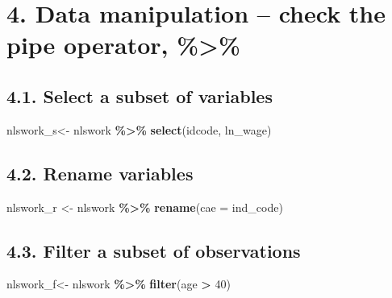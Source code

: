 \documentclass[
]{article}
\newenvironment{Shaded}{\begin{snugshade}}{\end{snugshade}}
\newcommand{\AttributeTok}[1]{\textcolor[rgb]{0.13,0.29,0.53}{#1}}
\newcommand{\DecValTok}[1]{\textcolor[rgb]{0.00,0.00,0.81}{#1}}
\newcommand{\FunctionTok}[1]{\textcolor[rgb]{0.13,0.29,0.53}{\textbf{#1}}}
\newcommand{\NormalTok}[1]{#1}
\newcommand{\OtherTok}[1]{\textcolor[rgb]{0.56,0.35,0.01}{#1}}
\newcommand{\SpecialCharTok}[1]{\textcolor[rgb]{0.81,0.36,0.00}{\textbf{#1}}}
\begin{document}
\hypertarget{data-manipulation-check-the-pipe-operator}{%
\section{4. Data manipulation -- check the pipe operator,
\%\textgreater\%}\label{data-manipulation-check-the-pipe-operator}}

\hypertarget{select-a-subset-of-variables}{%
\subsection{4.1. Select a subset of
variables}\label{select-a-subset-of-variables}}

\begin{Shaded}
\begin{Highlighting}[]
\NormalTok{nlswork\_s}\OtherTok{\textless{}{-}}\NormalTok{ nlswork }\SpecialCharTok{\%\textgreater{}\%} 
  \FunctionTok{select}\NormalTok{(idcode, ln\_wage) }
\end{Highlighting}
\end{Shaded}

\hypertarget{rename-variables}{%
\subsection{4.2. Rename variables}\label{rename-variables}}

\begin{Shaded}
\begin{Highlighting}[]
\NormalTok{nlswork\_r }\OtherTok{\textless{}{-}}\NormalTok{ nlswork }\SpecialCharTok{\%\textgreater{}\%} 
  \FunctionTok{rename}\NormalTok{(}\AttributeTok{cae =}\NormalTok{ ind\_code)}
\end{Highlighting}
\end{Shaded}

\hypertarget{filter-a-subset-of-observations}{%
\subsection{4.3. Filter a subset of
observations}\label{filter-a-subset-of-observations}}

\begin{Shaded}
\begin{Highlighting}[]
\NormalTok{nlswork\_f}\OtherTok{\textless{}{-}}\NormalTok{ nlswork }\SpecialCharTok{\%\textgreater{}\%} 
  \FunctionTok{filter}\NormalTok{(age }\SpecialCharTok{\textgreater{}} \DecValTok{40}\NormalTok{) }
\end{Highlighting}
\end{Shaded}
\end{document}
